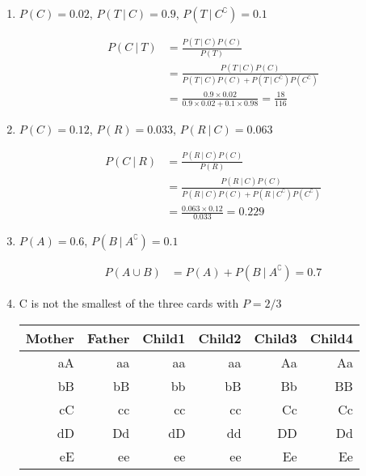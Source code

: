 \begin{enumerate}
	\item $ P(C) = 0.02 $, $ P(T\ |\ C) = 0.9 $, $ P(T\ |\ C^\complement) = 0.1 $
	
	\begin{align}
		P(C\ |\ T) &= \frac{P(T\ |\ C)P(C)}{P(T)} \\
		&= \frac{P(T\ |\ C)P(C)}{P(T\ |\ C)P(C) + P(T\ |\ C^\complement)P(C^\complement)} \\
		&= \frac{0.9 \times 0.02}{0.9 \times 0.02 + 0.1 \times 0.98} = \frac{18}{116}
	\end{align}
	
	\item $ P(C) = 0.12 $, $ P(R) = 0.033 $, $ P(R\ |\ C) = 0.063 $
	
	\begin{align}
		P(C\ |\ R) &= \frac{P(R\ |\ C)P(C)}{P(R)} \\
		&= \frac{P(R\ |\ C)P(C)}{P(R\ |\ C)P(C) + P(R\ |\ C^\complement)P(C^\complement)} \\
		&= \frac{0.063 \times 0.12}{0.033} = 0.229
	\end{align} 
	
	
	\item $ P(A) = 0.6 $, $ P(B\ |\ A^\complement) = 0.1 $
	
	\begin{align}
		P(A \cup B) &= P(A) + P(B\ |\ A^\complement) = 0.7
	\end{align} 
	
	\item C is not the smallest of the three cards with $ P = 2/3 $
	
	\begin{table}[H]
		\centering
		\begin{tabular}{@{}rr|rrrr@{}}
			\toprule
			Mother & Father & Child1 & Child2 & Child3 & Child4 \\ \midrule
			aA     & aa		& aa	 & aa 	  & Aa 	   & Aa   \\
			bB     & bB     & bb	 & bB 	  & Bb 	   & BB    \\
			cC     & cc     & cc	 & cc 	  & Cc 	   & Cc    \\
			dD     & Dd     & dD	 & dd 	  & DD 	   & Dd    \\
			eE     & ee     & ee	 & ee 	  & Ee 	   & Ee    \\ \bottomrule
		\end{tabular}
	\end{table}
	
	
	
\end{enumerate} 